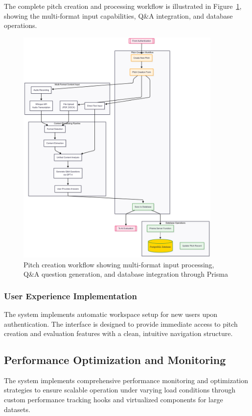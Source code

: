 The complete pitch creation and processing workflow is illustrated in Figure~\ref{fig:user-flow-pitch}, showing the multi-format input capabilities, Q\&A integration, and database operations.

\begin{figure}[H]
  \centering
  \includegraphics[width=0.9\textwidth]{img/user-flow-pitch}
  \caption{Pitch creation workflow showing multi-format input processing, Q\&A question generation, and database integration through Prisma}
  \label{fig:user-flow-pitch}
\end{figure}

\subsubsection{User Experience Implementation}
The system implements automatic workspace setup for new users upon authentication. The interface is designed to provide immediate access to pitch creation and evaluation features with a clean, intuitive navigation structure.

\subsection{Performance Optimization and Monitoring}
The system implements comprehensive performance monitoring and optimization strategies to ensure scalable operation under varying load conditions through custom performance tracking hooks and virtualized components for large datasets.

